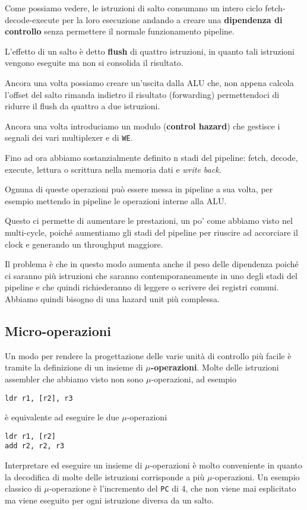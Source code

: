 Come possiamo vedere, le istruzioni di salto consumano un intero ciclo fetch-decode-execute per la
loro esecuzione andando a creare una \textbf{dipendenza di controllo} senza permettere il normale
funzionamento pipeline.

L'effetto di un salto è detto \textbf{flush} di quattro istruzioni, in quanto tali istruzioni
vengono eseguite ma non si consolida il risultato.

Ancora una volta possiamo creare un'uscita dalla ALU che, non appena calcola l'offset del salto
rimanda indietro il risultato (forwarding) permettendoci di ridurre il flush da quattro a due
istruzioni.

Ancora una volta introduciamo un modulo (\textbf{control hazard}) che gestisce i segnali dei vari
multiplexer e di \verb|WE|.

Fino ad ora abbiamo sostanzialmente definito n stadi del pipeline: fetch, decode, execute, lettura
o scrittura nella memoria dati e \emph{write back}.

Ognuna di queste operazioni può essere messa in pipeline a sua volta, per esempio mettendo in
pipeline le operazioni interne alla ALU.

Questo ci permette di aumentare le prestazioni, un po' come abbiamo visto nel multi-cycle, poiché
aumentiamo gli stadi del pipeline per riuscire ad accorciare il clock e generando un throughput
maggiore.

Il problema è che in questo modo aumenta anche il peso delle dipendenza poiché ci saranno più
istruzioni che saranno contemporaneamente in uno degli stadi del pipeline e che quindi
richiederanno di leggere o scrivere dei registri comuni. Abbiamo quindi bisogno di una hazard unit
più complessa.

\subsection{Micro-operazioni}
Un modo per rendere la progettazione delle varie unità di controllo più facile è tramite la
definizione di un insieme di \textbf{$\mu$-operazioni}. Molte delle istruzioni assembler che
abbiamo visto non sono $\mu$-operazioni, ad esempio
\begin{verbatim}
ldr r1, [r2], r3
\end{verbatim}
è equivalente ad eseguire le due $\mu$-operazioni
\begin{verbatim}
ldr r1, [r2]
add r2, r2, r3
\end{verbatim}
Interpretare ed eseguire un insieme di $\mu$-operazioni è molto conveniente in quanto la decodifica
di molte delle istruzioni corrisponde a più $\mu$-operazioni. Un esempio classico di
$\mu$-operazione è l'incremento del \verb|PC| di 4, che non viene mai esplicitato ma viene eseguito
per ogni istruzione diversa da un salto.

